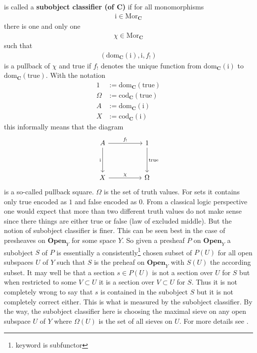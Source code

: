 \begin{exa}
\begin{enumerate}
is called a \textbf{subobject classifier (of $\mathbf{C}$)} if for all monomorphisms
\begin{align*}
  \mathrm{i}
  \in
  \mathrm{Mor}_{\mathbf{C}}
\end{align*}
there is one and only one
\begin{align*}
  \chi
  \in
  \mathrm{Mor}_{\mathbf{C}}
\end{align*}
such that
\begin{align*}
  \left(
    \mathrm{dom}_{\mathbf{C}}(\mathrm{i}),
    \mathrm{i},
    f_{!}
  \right)
\end{align*}
is a pullback of $\chi$ and $\mathrm{true}$ if $f_{!}$ denotes the unique function from $\mathrm{dom}_{\mathbf{C}}(\mathrm{i})$ to $\mathrm{dom}_{\mathbf{C}}(\mathrm{true})$. With the notation
\begin{align*}
  1
  &:=
  \mathrm{dom}_{\mathbf{C}}(\mathrm{true})
  \\
  \Omega
  &:=
  \mathrm{cod}_{\mathbf{C}}(\mathrm{true})
  \\
  A
  &:=
  \mathrm{dom}_{\mathbf{C}}(\mathrm{i})
  \\
  X
  &:=
  \mathrm{cod}_{\mathbf{C}}(\mathrm{i})
\end{align*}
this informally means that the diagram
\[
\begin{tikzcd}[sep=huge]
  A
  \arrow{r}{f_{!}}
  \arrow[swap]{d}{\mathrm{i}}
  &
  1
  \arrow{d}{\mathrm{true}}
  \\
  X
  \arrow{r}{\chi}
  &
  \Omega
\end{tikzcd}
\]
is a so-called pullback square. $\Omega$ is the set of truth values. For sets it contains only true encoded as $1$ and false encoded as $0$. From a classical logic perspective one would expect that more than two different truth values do not make sense since there things are either true or false (law of excluded middle). But the notion of subobject classifier is finer. This can be seen best in the case of presheaves on $\mathbf{Open}_{Y}$ for some space $Y$. So given a presheaf $P$ on $\mathbf{Open}_{Y}$ a subobject $S$ of $P$ is essentially a consistently\footnote{keyword is subfunctor} chosen subset of $P(U)$ for all open subspaces $U$ of $Y$ such that $S$ is the preheaf on $\mathbf{Open}_{Y}$ with $S(U)$ the according subset. It may well be that a section $s \in P(U)$ is not a section over $U$ for $S$ but when restricted to some $V \subset U$ it is a section over $V \subset U$ for $S$. Thus it is not completely wrong to say that $s$ is contained in the subobject $S$ but it is not completely correct either. This is what is measured by the subobject classifier. By the way, the subobject classifier here is choosing the maximal sieve on any open subspace $U$ of $Y$ where $\Omega(U)$ is the set of all sieves on $U$. For more details see \cite{c55c71e8}.

\end{enumerate}
\end{exa}
